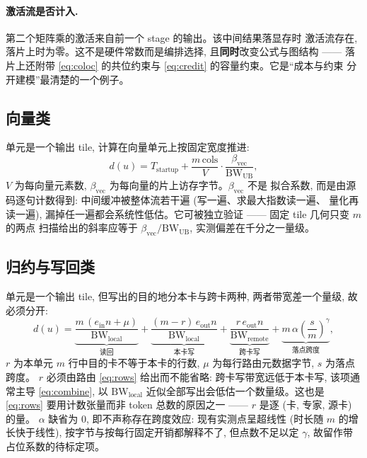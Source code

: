 \documentclass[11pt,a4paper]{article}
\newcommand{\BW}{\mathrm{BW}}
\begin{document}
\paragraph{激活流是否计入.} 第二个矩阵乘的激活来自前一个 stage 的输出。该中间结果落显存时
激活流存在, 落片上时为零。这不是硬件常数而是编排选择, 且\textbf{同时}改变公式与图结构 ——
落片上还附带 \eqref{eq:coloc} 的共位约束与 \eqref{eq:credit} 的容量约束。它是``成本与约束
分开建模''最清楚的一个例子。

\subsection{向量类}
\label{sec:f-vec}

单元是一个输出 tile, 计算在向量单元上按固定宽度推进:
\begin{equation}
d(u) = T_{\text{startup}} + \frac{m\,\text{cols}}{V}\cdot
       \frac{\beta_{\text{vec}}}{\BW_{\mathrm{UB}}},
\label{eq:vec}
\end{equation}
$V$ 为每向量元素数, $\beta_{\text{vec}}$ 为每向量的片上访存字节。$\beta_{\text{vec}}$ 不是
拟合系数, 而是由源码逐句计数得到: 中间缓冲被整体流若干遍 (写一遍、求最大指数读一遍、
量化再读一遍), 漏掉任一遍都会系统性低估。它可被独立验证 —— 固定 tile 几何只变 $m$ 的两点
扫描给出的斜率应等于 $\beta_{\text{vec}}/\BW_{\mathrm{UB}}$, 实测偏差在千分之一量级。

\subsection{归约与写回类}
\label{sec:f-combine}

单元是一个输出 tile, 但写出的目的地分本卡与跨卡两种, 两者带宽差一个量级, 故必须分开:
\begin{equation}
d(u) =
  \underbrace{\frac{m\,(e_{\text{in}} n + \mu)}{\BW_{\text{local}}}}_{\text{读回}}
+ \underbrace{\frac{(m-r)\, e_{\text{out}} n}{\BW_{\text{local}}}}_{\text{本卡写}}
+ \underbrace{\frac{r\, e_{\text{out}} n}{\BW_{\text{remote}}}}_{\text{跨卡写}}
+ \underbrace{m\,\alpha\left(\frac{s}{m}\right)^{\!\gamma}}_{\text{落点跨度}} ,
\label{eq:combine}
\end{equation}
$r$ 为本单元 $m$ 行中目的卡不等于本卡的行数, $\mu$ 为每行路由元数据字节, $s$ 为落点跨度。
$r$ 必须由路由 \eqref{eq:rows} 给出而不能省略: 跨卡写带宽远低于本卡写, 该项通常主导
\eqref{eq:combine}, 以 $\BW_{\text{local}}$ 近似全部写出会低估一个数量级。这也是
\eqref{eq:rows} 要用计数张量而非 token 总数的原因之一 —— $r$ 是逐 (卡, 专家, 源卡) 的量。
$\alpha$ 缺省为 0, 即不声称存在跨度效应: 现有实测点呈超线性 (时长随 $m$ 的增长快于线性),
按字节与按每行固定开销都解释不了, 但点数不足以定 $\gamma$, 故留作带占位系数的待标定项。
\end{document}
